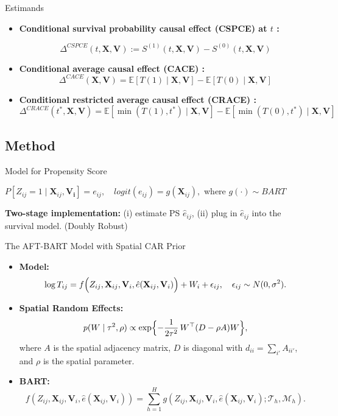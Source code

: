 \begin{frame}{Estimands}
\begin{itemize}
    \item \textbf{Conditional survival probability causal effect (CSPCE) at $t$ :} 

\[ \Delta^{CSPCE}(t,\mathbf{X},\mathbf{V}) := S^{(1)}(t,\mathbf{X},\mathbf{V}) - S^{(0)}(t,\mathbf{X},\mathbf{V}) \]


\item \textbf{Conditional average causal effect (CACE) :} 
\[\Delta^{CACE}(\mathbf{X},\mathbf{V}) = \mathbb{E}[T(1)\mid \mathbf{X},\mathbf{V}] - \mathbb{E}[T(0)\mid \mathbf{X},\mathbf{V}] \]
\item \textbf{Conditional restricted average causal effect (CRACE) :}
\[\Delta^{CRACE}(t^*,\mathbf{X},\mathbf{V}) = \mathbb{E}[\min(T(1), t^*)\mid \mathbf{X},\mathbf{V}] - \mathbb{E}[\min(T(0), t^*)\mid \mathbf{X},\mathbf{V}] \]

\end{itemize}
    
\end{frame}


\subsection{Method}
\begin{frame}{Model for Propensity Score}
   
  $P[Z_{ij}=1\mid \mathbf{X}_{ij},\mathbf{V_i}]=e_{ij}, \quad logit(e_{ij})=g(\mathbf{X}_{ij}),$ where $g(\cdot)\sim BART$
  
  
  
  \vspace{30pt}
  \textbf{Two-stage implementation:} (i) estimate PS $\hat{e}_{ij}$, (ii) plug in $\hat{e}_{ij}$ into the survival model. (Doubly Robust)
  
  \end{frame}


\begin{frame}{The AFT-BART Model with Spatial CAR Prior}
  \begin{itemize}
    \item \textbf{Model:} 
      \[
      \log T_{ij} = f\Bigl(Z_{ij},\mathbf{X}_{ij},\mathbf{V}_i,\hat{e}(\mathbf{X}_{ij},\mathbf{V}_i)\Bigr) + W_i + \epsilon_{ij},\quad \epsilon_{ij}\sim N(0,\sigma^2).
      \]
    \item \textbf{Spatial Random Effects:} 
      \[
      p(W\mid \tau^2,\rho) \propto \exp\Bigl\{-\frac{1}{2\tau^2}\,W^\top (D-\rho A)W\Bigr\},
      \]
      where \(A\) is the spatial adjacency matrix, \(D\) is diagonal with \(d_{ii}=\sum_{i'}A_{ii'}\), and \(\rho\) is the spatial parameter.
    \item \textbf{BART:} 
      \[
      f(Z_{ij},\mathbf{X}_{ij},\mathbf{V}_i,\hat{e}(\mathbf{X}_{ij},\mathbf{V}_i))=\sum_{h=1}^{H} g(Z_{ij},\mathbf{X}_{ij},\mathbf{V}_i,\hat{e}(\mathbf{X}_{ij},\mathbf{V}_i);\mathcal{T}_h,\mathcal{M}_h).
      \]
  \end{itemize}
\end{frame}


